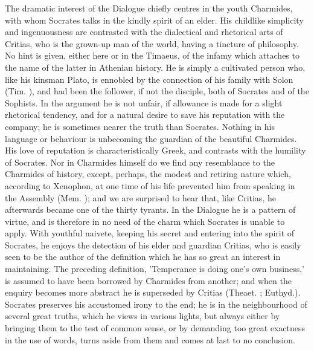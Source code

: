\documentclass[11pt,letter]{article}
\begin{document}
\par  The dramatic interest of the Dialogue chiefly centres in the youth Charmides, with whom Socrates talks in the kindly spirit of an elder. His childlike simplicity and ingenuousness are contrasted with the dialectical and rhetorical arts of Critias, who is the grown-up man of the world, having a tincture of philosophy. No hint is given, either here or in the Timaeus, of the infamy which attaches to the name of the latter in Athenian history. He is simply a cultivated person who, like his kinsman Plato, is ennobled by the connection of his family with Solon (Tim. ), and had been the follower, if not the disciple, both of Socrates and of the Sophists. In the argument he is not unfair, if allowance is made for a slight rhetorical tendency, and for a natural desire to save his reputation with the company; he is sometimes nearer the truth than Socrates. Nothing in his language or behaviour is unbecoming the guardian of the beautiful Charmides. His love of reputation is characteristically Greek, and contrasts with the humility of Socrates. Nor in Charmides himself do we find any resemblance to the Charmides of history, except, perhaps, the modest and retiring nature which, according to Xenophon, at one time of his life prevented him from speaking in the Assembly (Mem. ); and we are surprised to hear that, like Critias, he afterwards became one of the thirty tyrants. In the Dialogue he is a pattern of virtue, and is therefore in no need of the charm which Socrates is unable to apply. With youthful naivete, keeping his secret and entering into the spirit of Socrates, he enjoys the detection of his elder and guardian Critias, who is easily seen to be the author of the definition which he has so great an interest in maintaining. The preceding definition, 'Temperance is doing one's own business,' is assumed to have been borrowed by Charmides from another; and when the enquiry becomes more abstract he is superseded by Critias (Theaet. ; Euthyd.). Socrates preserves his accustomed irony to the end; he is in the neighbourhood of several great truths, which he views in various lights, but always either by bringing them to the test of common sense, or by demanding too great exactness in the use of words, turns aside from them and comes at last to no conclusion.
\end{document}
